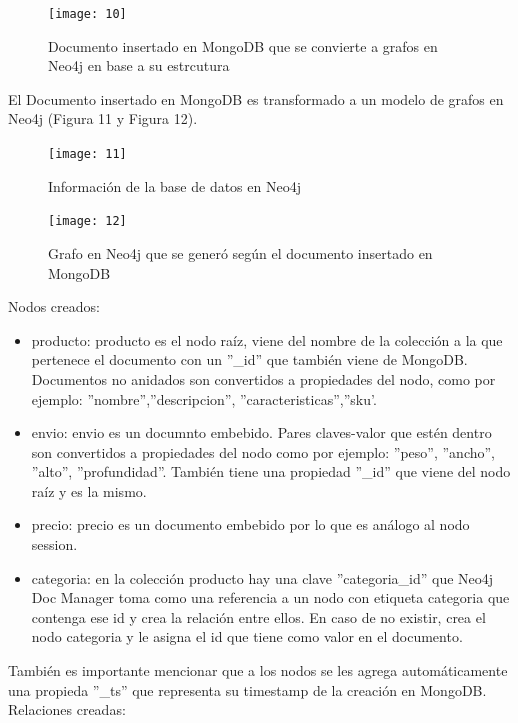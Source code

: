 \documentclass[conference]{IEEEtran}
\begin{document}
\begin{figure}[!h]
\centering
\texttt{[image: 10]}
\caption{Documento insertado en MongoDB que se convierte a grafos en Neo4j en base a su estrcutura}
\label{}
\end{figure}

El Documento insertado en MongoDB es transformado a un modelo de grafos en Neo4j (Figura 11 y Figura 12).\\

\begin{figure}[!h]
\centering
\texttt{[image: 11]}
\caption{Informaci\'on de la base de datos en Neo4j}
\label{}
\end{figure}

\begin{figure}[!h]
\centering
\texttt{[image: 12]}
\caption{Grafo en Neo4j que se gener\'o seg\'un el documento insertado en MongoDB}
\label{}
\end{figure}

Nodos creados:\\
\begin{itemize}
\item producto: producto es el nodo ra\'iz, viene del nombre de la colecci\'on a la que pertenece el documento con un  ''\_id'' que tambi\'en viene de MongoDB. Documentos no anidados son convertidos a propiedades del nodo, como por ejemplo: ''nombre'',''descripcion'', ''caracteristicas'',''sku'.
\item envio: envio es un documnto embebido. Pares claves-valor que est\'en dentro son convertidos a propiedades del nodo como por ejemplo: ''peso'', ''ancho'', ''alto'', ''profundidad''. Tambi\'en tiene una propiedad ''\_id'' que viene del nodo ra\'iz y es la mismo.
\item precio: precio es un documento embebido por lo que es análogo al nodo session.
\item categoria: en la colecci\'on producto hay una clave ''categoria\_id'' que Neo4j Doc Manager toma como una referencia a un nodo con etiqueta categoria que contenga ese id y crea la relaci\'on entre ellos. En caso de no existir, crea el nodo categoria y le asigna el id que tiene como valor en el documento.
\end{itemize}
También es importante mencionar que a los nodos se les agrega autom\'aticamente una propieda ''\_ts'' que representa su timestamp de la creaci\'on en MongoDB.\\

Relaciones creadas:\\
\end{document}
